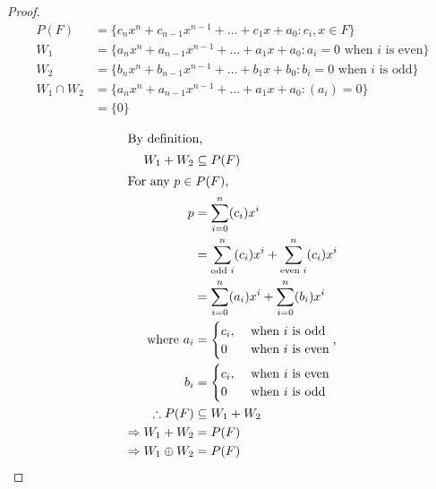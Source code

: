 \documentclass[12pt]{article}
\newenvironment{problem}[2][Problem]{\begin{trivlist}
\item[\hskip \labelsep {\bfseries #1}\hskip \labelsep {\bfseries #2.}]}{\end{trivlist}}
\begin{document}
\begin{problem}{25}
\end{problem}
\begin{proof}
\begin{align*}
P(F) &= \{ c_nx^n +c_{n-1}x^{n-1} +\ldots + c_1x+ a_0 : c_i, x \in F\} \\
W_1 &= \{ a_nx^n +a_{n-1}x^{n-1} +\ldots + a_1x+ a_0 : a_i = 0 \text{ when $i$ is even}\} \\
W_2 &= \{ b_nx^n +b_{n-1}x^{n-1} +\ldots + b_1x+ b_0 : b_i = 0 \text{ when $i$ is odd}\} \\
W_1 \cap W_2 &=
\{ a_nx^n +a_{n-1}x^{n-1} +\ldots + a_1x+ a_0 : (a_i) = 0 \} \\
&= \{0\} \\
\end{align*}
\begin{align*}
\intertext{By definition,}
W_1 + W_2 &\subseteq P(F) \\
\intertext{For any $p \in P(F)$,}
p &= \sum_{i=0}^{n} (c_i) x^i \\
&= \sum_{\text{odd $i$}}^{n} (c_i) x^i + \sum_{\text{even $i$}}^{n} (c_i) x^i \\
&= \sum_{i=0}^{n} (a_i) x^i + \sum_{i=0}^{n} (b_i) x^i \\
\text{where }
a_i &= 
\begin{cases}
	c_i, &\text{ when $i$ is odd} \\
	0 &\text{ when $i$ is even} \\
\end{cases}, \\
b_i &= 
\begin{cases}
	c_i, &\text{ when $i$ is even} \\
	0 &\text{ when $i$ is odd} \\
\end{cases} \\
\therefore P(F) &\subseteq W_1 + W_2 \\
\Rightarrow W_1 + W_2 &= P(F) \\
\Rightarrow W_1 \oplus W_2 &= P(F)
\end{align*}
\end{proof}
\filbreak
\end{document}
